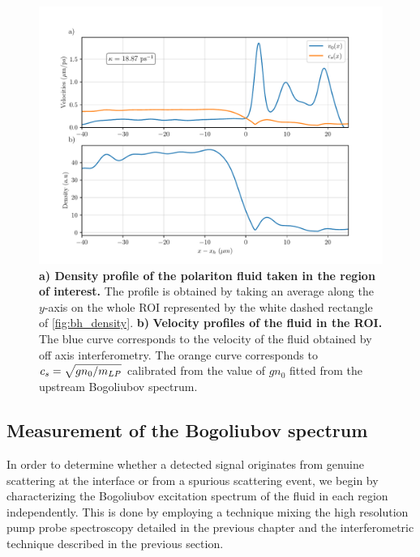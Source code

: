 \begin{figure}
    \centering
    \includegraphics[width=1\textwidth]{chap_stimulated_hawking/fig/bh_balistic.pdf}
    \caption{\textbf{a) Density profile of the polariton fluid taken in the region of interest.} The profile is obtained by taking an
    average along the $y$-axis on the whole ROI represented by the white dashed rectangle of \autoref{fig:bh_density}. \textbf{b)} \textbf{Velocity profiles of the fluid in the ROI.} The blue curve corresponds to the velocity of the fluid obtained by off axis interferometry. The orange
    curve corresponds to $c_s=\sqrt{gn_0/m_{LP}}$ calibrated from the value of $gn_0$ fitted from the upstream Bogoliubov spectrum.}
    \label{fig:bh_balistic}
\end{figure}

\subsection{Measurement of the Bogoliubov spectrum}

In order to determine whether a detected signal originates from genuine scattering at the interface or from a spurious scattering event, we begin by characterizing the Bogoliubov excitation spectrum of the fluid in each region independently.
This is done by employing a technique mixing the high resolution pump probe spectroscopy detailed in the previous chapter and the interferometric technique described in the previous section.

\bigskip

